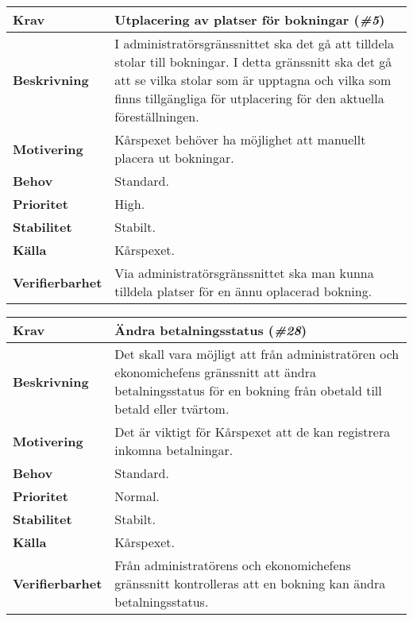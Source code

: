 \documentclass[a4paper, twoside, 11pt, titlepage]{article}
\begin{document}
		\begin{tabular} { p{2.6cm} p{12.5cm} }
			\hline
			\sffamily\textbf{Krav} & Utplacering av platser för bokningar (\emph{\#5})  \\
			\hline
			\sffamily\textbf{Beskrivning} & I administratörsgränssnittet ska det gå att tilldela stolar till bokningar. I detta gränssnitt ska det gå att se vilka stolar som är upptagna och vilka som finns tillgängliga för utplacering för den aktuella föreställningen.  \\
			\hline
			\sffamily\textbf{Motivering} & Kårspexet behöver ha möjlighet att manuellt placera ut bokningar.  \\
			\hline
			\sffamily\textbf{Behov} & Standard.  \\
			\hline
			\sffamily\textbf{Prioritet} & High.  \\
			\hline
			\sffamily\textbf{Stabilitet} & Stabilt.  \\
			\hline
			\sffamily\textbf{Källa} & Kårspexet.  \\
			\hline
			\sffamily\textbf{Verifierbarhet} & Via administratörsgränssnittet ska man kunna tilldela platser för en ännu oplacerad bokning.  \\
			\hline
		\end{tabular}
		\vspace{6mm}

		\begin{tabular} { p{2.6cm} p{12.5cm} }
			\hline
			\sffamily\textbf{Krav} & Ändra betalningsstatus (\emph{\#28})  \\
			\hline
			\sffamily\textbf{Beskrivning} & Det skall vara möjligt att från administratören och ekonomichefens gränssnitt att ändra betalningsstatus för en bokning från obetald till betald eller tvärtom.  \\
			\hline
			\sffamily\textbf{Motivering} & Det är viktigt för Kårspexet att de kan registrera inkomna betalningar.  \\
			\hline
			\sffamily\textbf{Behov} & Standard.  \\
			\hline
			\sffamily\textbf{Prioritet} & Normal.  \\
			\hline
			\sffamily\textbf{Stabilitet} & Stabilt.  \\
			\hline
			\sffamily\textbf{Källa} & Kårspexet.  \\
			\hline
			\sffamily\textbf{Verifierbarhet} & Från administratörens och ekonomichefens gränssnitt kontrolleras att en bokning kan ändra betalningsstatus.  \\
			\hline
		\end{tabular}
\end{document}

